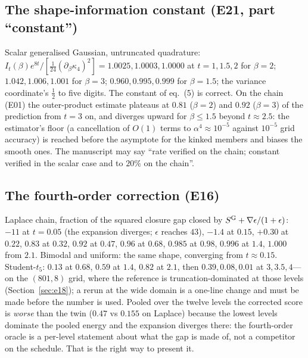 \subsection{The shape-information constant (E21, part ``constant'')}
\label{sec:scalar-const}
Scalar generalised Gaussian, untruncated quadrature: $I_t(\beta)e^{8t}/[\tfrac1{24}(\partial_\beta\kappa_4)^2]=1.0025, 1.0003, 1.0000$ at $t=1, 1.5, 2$ for $\beta=2$; $1.042, 1.006, 1.001$ for $\beta=3$; $0.960, 0.995, 0.999$ for $\beta=1.5$; the variance coordinate's $\tfrac12$ to five digits. The constant of eq.~(5) is correct. On the chain (E01) the outer-product estimate plateaus at $0.81$ ($\beta=2$) and $0.92$ ($\beta=3$) of the prediction from $t=3$ on, and diverges upward for $\beta\le1.5$ beyond $t\approx2.5$: the estimator's floor (a cancellation of $O(1)$ terms to $\alpha^4\approx10^{-5}$ against $10^{-5}$ grid accuracy) is reached before the asymptote for the kinked members and biases the smooth ones. The manuscript may say ``rate verified on the chain; constant verified in the scalar case and to $20\%$ on the chain''.

\subsection{The fourth-order correction (E16)}
\label{sec:e16}
Laplace chain, fraction of the squared closure gap closed by $S^{\mathrm{G}}+\nabla\epsilon/(1+\epsilon)$: $-11$ at $t=0.05$ (the expansion diverges; $\epsilon$ reaches $43$), $-1.4$ at $0.15$, $+0.30$ at $0.22$, $0.83$ at $0.32$, $0.92$ at $0.47$, $0.96$ at $0.68$, $0.985$ at $0.98$, $0.996$ at $1.4$, $1.000$ from $2.1$. Bimodal and uniform: the same shape, converging from $t\approx0.15$. Student-$t_5$: $0.13$ at $0.68$, $0.59$ at $1.4$, $0.82$ at $2.1$, then $0.39, 0.08, 0.01$ at $3, 3.5, 4$---on the $(801,8)$ grid, where the reference is truncation-dominated at those levels (Section~\ref{sec:e18}); a rerun at the wide domain is a one-line change and must be made before the number is used. Pooled over the twelve levels the corrected score is \emph{worse} than the twin ($0.47$ vs $0.155$ on Laplace) because the lowest levels dominate the pooled energy and the expansion diverges there: the fourth-order oracle is a per-level statement about what the gap is made of, not a competitor on the schedule. That is the right way to present it.

